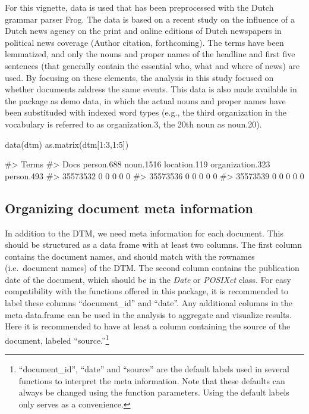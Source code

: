 For this vignette, data is used that has been preprocessed with the
Dutch grammar parser Frog. The data is based on a recent study on the
influence of a Dutch news agency on the print and online editions of
Dutch newspapers in political news coverage (Author citation,
forthcoming). The terms have been lemmatized, and only the nouns and
proper names of the headline and first five sentences (that generally
contain the essential who, what and where of news) are used. By focusing
on these elements, the analysis in this study focused on whether
documents address the same events. This data is also made available in
the package as demo data, in which the actual nouns and proper names
have been substituded with indexed word types (e.g., the third
organization in the vocabulary is referred to as organization.3, the
20th noun as noun.20).

\begin{Schunk}
\begin{Sinput}
data(dtm)
as.matrix(dtm[1:3,1:5])
\end{Sinput}
\begin{Soutput}
#>           Terms
#> Docs       person.688 noun.1516 location.119 organization.323 person.493
#>   35573532          0         0            0                0          0
#>   35573536          0         0            0                0          0
#>   35573539          0         0            0                0          0
\end{Soutput}
\end{Schunk}

\subsection{Organizing document meta information}

In addition to the DTM, we need meta information for each document. This
should be structured as a data frame with at least two columns. The
first column contains the document names, and should match with the
rownames (i.e.~document names) of the DTM. The second column contains
the publication date of the document, which should be in the \emph{Date}
or \emph{POSIXct} class. For easy compatibility with the functions
offered in this package, it is recommended to label these columns
``document\_id'' and ``date''. Any additional columns in the meta
data.frame can be used in the analysis to aggregate and visualize
results. Here it is recommended to have at least a column containing the
source of the document, labeled ``source.''\footnote{``document\_id'',
  ``date'' and ``source'' are the default labels used in several
  functions to interpret the meta information. Note that these defaults
  can always be changed using the function parameters. Using the default
  labels only serves as a convenience.}

